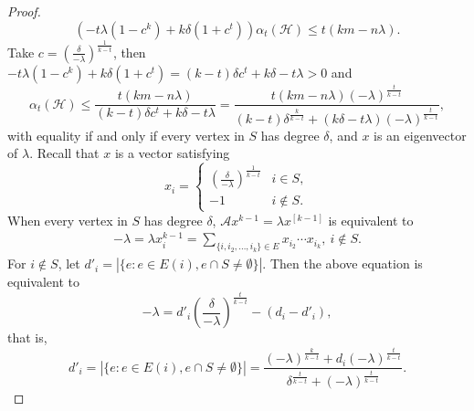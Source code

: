 \documentclass[10pt,a4paper]{amsart}
\begin{document}
\begin{proof}
\[\left( {-t \lambda \left( {1 - {c^k}} \right) + k \delta \left( {1 + {c^t}} \right)} \right){\alpha _t}(\mathcal{H})\leq t\left( {km - n\lambda } \right).\]
Take $c = {{\left( \frac{\delta }{-\lambda } \right)}^{\frac{1}{k-t}}}$, then
$ -t \lambda \left( {1 - {c}^k} \right) + k \delta \left( {1 + {c}^t} \right) = \left( {k - t} \right)\delta {c}^t + k \delta - t \lambda  > 0$ and
\[{\alpha _t}(\mathcal{H}) \leqslant \frac{{t\left( {km - n \lambda } \right)}}{{\left( {k - t} \right)\delta {c^t} + k \delta  - t \lambda }}=\frac{{t\left( {km - n \lambda } \right){{\left( { - \lambda } \right)}^{\frac{t}{{k - t}}}}}}{{\left( {k - t} \right){\delta ^{\frac{k}{{k - t}}}} + \left( {k \delta  - t\lambda } \right){{\left( { - \lambda } \right)}^{\frac{t}{{k - t}}}}}},\]
with equality if and only if every vertex in $S$ has degree $\delta$, and $x$ is an eigenvector of $\lambda$. Recall that $x$ is a vector satisfying
$${x_i} =
\begin{cases}
 {{\left( \frac{\delta }{-\lambda } \right)}^{\frac{1}{k-t}}} & i \in S,\\
-1 & i \notin S.
\end{cases}
$$
When every vertex in $S$ has degree $\delta$, $\mathcal{A}x^{k-1}=\lambda x^{[k-1]}$ is equivalent to
\begin{eqnarray*}
-\lambda=\lambda x_i^{k-1}=\sum_{\{i,i_2,\ldots,i_k\}\in E}x_{i_2}\cdots x_{i_k},~i\notin S.
\end{eqnarray*}
For $i\notin S$, let $d'_i = \left| \{e: e \in E(i),e\cap S \neq \emptyset \}\right|$. Then the above equation is equivalent to
$$-\lambda = d'_i {{\left( \frac{\delta }{-\lambda } \right)}^{\frac{t}{k-t}}} - (d_i - d'_i),$$
that is,
$$d'_i = \left| {\{ e:e \in E(i),e\cap S \ne \emptyset \} } \right| = \frac{{{{\left( { - \lambda } \right)}^{\frac{k}{{k - t}}}} + {d_i}{{\left( { - \lambda } \right)}^{\frac{t}{{k - t}}}}}}{{{\delta ^{\frac{t}{{k - t}}}} + {{\left( { - \lambda } \right)}^{\frac{t}{{k - t}}}}}}.$$
\end{proof}
\end{document}
